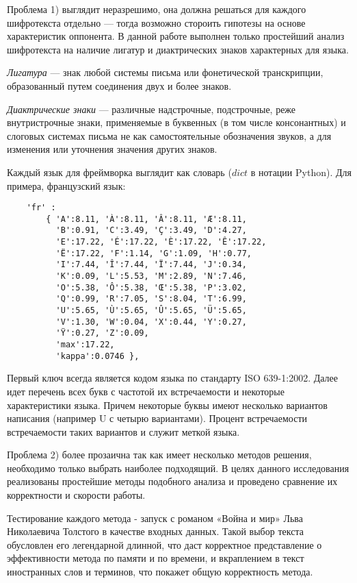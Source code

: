 Проблема 1) выглядит неразрешимо, она должна решаться для
каждого шифротекста отдельно — тогда возможно стороить гипотезы 
на основе характеристик оппонента. В данной работе выполнен только 
простейший анализ шифротекста на наличие лигатур и 
диактрических знаков характерных для языка.

\DEF\textit{Лигатура} — знак любой системы письма или 
фонетической транскрипции, образованный путем соединения 
двух и более знаков.

\DEF\textit{Диактрические знаки} — различные надстрочные, подстрочные,
реже внутристрочные знаки, применяемые в буквенных (в том числе 
консонантных) и слоговых системах письма не как самостоятельные 
обозначения звуков, а для изменения или уточнения значения других 
знаков.

Каждый язык для фреймворка выглядит как словарь ($dict$ в нотации
Python). Для примера, французский язык:

\begin{verbatim}
    'fr' :
        { 'A':8.11, 'À':8.11, 'Â':8.11, 'Æ':8.11, 
          'B':0.91, 'C':3.49, 'Ç':3.49, 'D':4.27, 
          'E':17.22, 'É':17.22, 'È':17.22, 'Ê':17.22, 
          'Ë':17.22, 'F':1.14, 'G':1.09, 'H':0.77, 
          'I':7.44, 'Î':7.44, 'Ï':7.44, 'J':0.34, 
          'K':0.09, 'L':5.53, 'M':2.89, 'N':7.46, 
          'O':5.38, 'Ô':5.38, 'Œ':5.38, 'P':3.02, 
          'Q':0.99, 'R':7.05, 'S':8.04, 'T':6.99, 
          'U':5.65, 'Ù':5.65, 'Û':5.65, 'Ü':5.65, 
          'V':1.30, 'W':0.04, 'X':0.44, 'Y':0.27, 
          'Ÿ':0.27, 'Z':0.09, 
          'max':17.22, 
          'kappa':0.0746 },
\end{verbatim}

Первый ключ всегда является кодом языка по стандарту ISO 639-1:2002.
Далее идет перечень всех букв с частотой их встречаемости и 
некоторые характеристики языка. Причем некоторые буквы имеют
несколько вариантов написания (например U с четырю вариантами).
Процент встречаемости встречаемости таких вариантов
и служит меткой языка.

Проблема 2) более прозаична так как имеет несколько методов 
решения, необходимо только выбрать наиболее подходящий.
В целях данного 
исследования реализованы простейшие методы подобного анализа и 
проведено сравнение их корректности и скорости работы.

Тестирование каждого метода - запуск с романом «Война и мир» Льва 
Николаевича 
Толстого в качестве входных данных. Такой выбор текста обусловлен его 
легендарной длинной, что даст корректное представление о эффективности 
метода по памяти и по времени, и вкраплением в текст иностранных слов 
и терминов, что покажет общую корректность метода.
